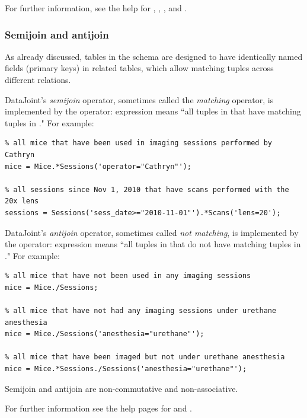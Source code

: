 \documentclass[10pt]{article}
\begin{document}
For further information, see the help for , , , and .

\subsubsection{Semijoin and antijoin}
As already discussed, tables in the schema are designed to have identically named fields (primary keys) in related tables, which allow matching tuples across different relations.  

DataJoint's {\em semijoin} operator, sometimes called the {\em matching} operator,  is implemented by the  operator:  expression  means ``all tuples in  that have matching tuples in ." For example:
\begin{lstlisting}
% all mice that have been used in imaging sessions performed by Cathryn
mice = Mice.*Sessions('operator="Cathryn"');  

% all sessions since Nov 1, 2010 that have scans performed with the 20x lens
sessions = Sessions('sess_date>="2010-11-01"').*Scans('lens=20');
\end{lstlisting}

DataJoint's {\em antijoin} operator, sometimes called {\em not matching}, is implemented by the  operator: expression  means ``all tuples in  that do not have matching tuples in ." For example:

\begin{lstlisting}
% all mice that have not been used in any imaging sessions
mice = Mice./Sessions;

% all mice that have not had any imaging sessions under urethane anesthesia
mice = Mice./Sessions('anesthesia="urethane"');  

% all mice that have been imaged but not under urethane anesthesia
mice = Mice.*Sessions./Sessions('anesthesia="urethane"');  
\end{lstlisting}

Semijoin and antijoin are non-commutative and non-associative.

For further information see the help pages for  and .
\end{document}
